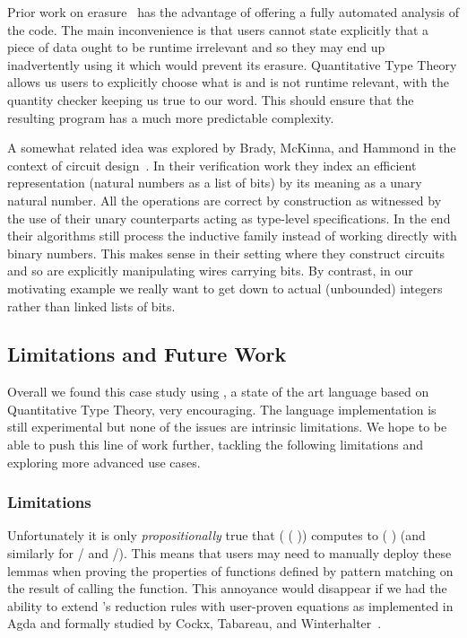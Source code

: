 Prior work on erasure~\cite{DBLP:journals/pacmpl/Tejiscak20} has the advantage of
offering a fully automated analysis of the code. The main inconvenience is that users
cannot state explicitly that a piece of data ought to be runtime irrelevant and so
they may end up inadvertently using it which would prevent its erasure.
%
Quantitative Type Theory allows us users to explicitly choose what is and is not
runtime relevant, with the quantity checker keeping us true to our word.
%
This should ensure that the resulting program has a much more predictable complexity.

A somewhat related idea was explored by Brady, McKinna, and Hammond in the context of
circuit design~\cite{DBLP:conf/sfp/BradyMH07}. In their verification work they index
an efficient representation (natural numbers as a list of bits) by its meaning as a
unary natural number. All the operations are correct by construction as witnessed by
the use of their unary counterparts acting as type-level specifications.
%
In the end their algorithms still process the inductive family instead of working
directly with binary numbers. This makes sense in their setting where they construct
circuits and so are explicitly manipulating wires carrying bits.
%
By contrast, in our motivating example we really want to get down to actual (unbounded)
integers rather than linked lists of bits.


\subsection{Limitations and Future Work}

Overall we found this case study using \idris{}, a state of the art language
based on Quantitative Type Theory, very encouraging.
%
The language implementation is still experimental
\iftoggle{APPENDIX}{
  (see for instance \cref{appendix:limitations} for some of the bugs we found)}{}
but none of the issues are intrinsic limitations.
%
We hope to be able to push this line of work further, tackling the following
limitations and exploring more advanced use cases.

\subsubsection{Limitations}

Unfortunately it is only \emph{propositionally} true that
( (  ))
computes to (  ) (and similarly for
/ and /).
%
This means that users may need to manually deploy these lemmas when proving the
properties of functions defined by pattern matching on the result of calling the
 function.
%
This annoyance would disappear if we had the ability to extend \idris{}'s reduction rules
with user-proven equations as implemented in Agda and formally studied
by Cockx, Tabareau, and Winterhalter~\cite{DBLP:journals/pacmpl/CockxTW21}.

